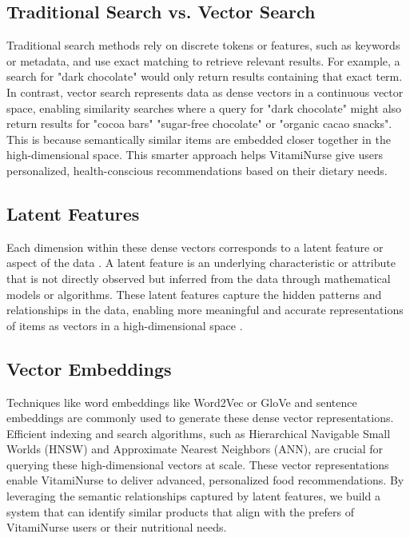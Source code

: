 \subsection{Traditional Search vs. Vector Search}

Traditional search methods rely on discrete tokens or features, such as keywords or metadata, and use exact matching to retrieve relevant results. 
For example, a search for "dark chocolate" would only return results containing that exact term. In contrast, vector search represents data as dense vectors in a continuous vector space, enabling similarity searches where a query for "dark chocolate" might also return results for "cocoa bars" "sugar-free chocolate" or "organic cacao snacks". This is because semantically similar items are embedded closer together in the high-dimensional space. This smarter approach helps VitamiNurse give users personalized, health-conscious recommendations based on  their dietary needs.


\subsection{Latent Features}
Each dimension within these dense vectors corresponds to a latent feature or aspect of the data . A latent feature is an underlying characteristic or attribute that is not directly observed but inferred from the data through mathematical models or algorithms. These latent features capture the hidden patterns and relationships in the data, enabling more meaningful and accurate representations of items as vectors in a high-dimensional space . 
\subsection{Vector Embeddings}
\par Techniques like word embeddings like Word2Vec or GloVe and sentence embeddings are commonly used to generate these dense vector representations\cite{reimers-gurevych-2019-sentence}. Efficient indexing and search algorithms, such as Hierarchical Navigable Small Worlds (HNSW) and Approximate Nearest Neighbors (ANN), are crucial for querying these high-dimensional vectors at scale\cite{HNSW}.
These vector representations enable VitamiNurse to deliver advanced, personalized food recommendations. By leveraging the semantic relationships captured by latent features, we  build a system that can identify  similar products that align with the prefers of VitamiNurse users or their nutritional needs.


